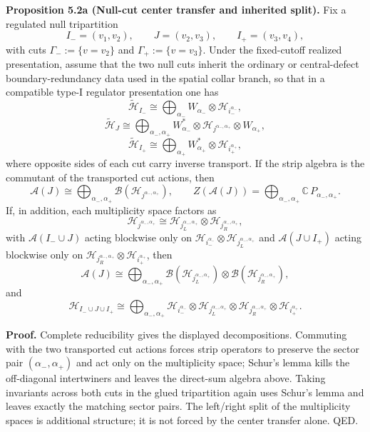 \textbf{Proposition 5.2a (Null-cut center transfer and inherited split).} Fix a regulated null tripartition
\[
I_-=(v_1,v_2),\qquad
J=(v_2,v_3),\qquad
I_+=(v_3,v_4),
\]
with cuts \(\Gamma_-:=\{v=v_2\}\) and \(\Gamma_+:=\{v=v_3\}\). Under the fixed-cutoff realized presentation, assume that the two null cuts inherit the ordinary or central-defect boundary-redundancy data used in the spatial collar branch, so that in a compatible type-I regulator presentation one has
\[
\tilde{\mathcal H}_{I_-}
\cong
\bigoplus_{\alpha_-}
W_{\alpha_-}\otimes \mathcal H_{i_-^{\alpha_-}},
\]
\[
\tilde{\mathcal H}_{J}
\cong
\bigoplus_{\alpha_-,\alpha_+}
W_{\alpha_-}^{*}\otimes
\mathcal H_{j^{\alpha_-,\alpha_+}}\otimes
W_{\alpha_+},
\]
\[
\tilde{\mathcal H}_{I_+}
\cong
\bigoplus_{\alpha_+}
W_{\alpha_+}^{*}\otimes \mathcal H_{i_+^{\alpha_+}},
\]
where opposite sides of each cut carry inverse transport. If the strip algebra is the commutant of the transported cut actions, then
\[
\mathcal A(J)
\cong
\bigoplus_{\alpha_-,\alpha_+}
\mathcal B(\mathcal H_{j^{\alpha_-,\alpha_+}}),
\qquad
Z(\mathcal A(J))
=
\bigoplus_{\alpha_-,\alpha_+}\mathbb C\,P_{\alpha_-,\alpha_+}.
\]
If, in addition, each multiplicity space factors as
\[
\mathcal H_{j^{\alpha_-,\alpha_+}}
\cong
\mathcal H_{j_L^{\alpha_-,\alpha_+}}
\otimes
\mathcal H_{j_R^{\alpha_-,\alpha_+}},
\]
with \(\mathcal A(I_-\cup J)\) acting blockwise only on
\(\mathcal H_{i_-^{\alpha_-}}\otimes \mathcal H_{j_L^{\alpha_-,\alpha_+}}\)
and \(\mathcal A(J\cup I_+)\) acting blockwise only on
\(\mathcal H_{j_R^{\alpha_-,\alpha_+}}\otimes \mathcal H_{i_+^{\alpha_+}}\),
then
\[
\mathcal A(J)
\cong
\bigoplus_{\alpha_-,\alpha_+}
\mathcal B(\mathcal H_{j_L^{\alpha_-,\alpha_+}})
\otimes
\mathcal B(\mathcal H_{j_R^{\alpha_-,\alpha_+}}),
\]
and
\[
\mathcal H_{I_-\cup J\cup I_+}
\cong
\bigoplus_{\alpha_-,\alpha_+}
\mathcal H_{i_-^{\alpha_-}}
\otimes
\mathcal H_{j_L^{\alpha_-,\alpha_+}}
\otimes
\mathcal H_{j_R^{\alpha_-,\alpha_+}}
\otimes
\mathcal H_{i_+^{\alpha_+}}.
\]

\textbf{Proof.} Complete reducibility gives the displayed decompositions. Commuting with the two transported cut actions forces strip operators to preserve the sector pair \((\alpha_-,\alpha_+)\) and act only on the multiplicity space; Schur's lemma kills the off-diagonal intertwiners and leaves the direct-sum algebra above. Taking invariants across both cuts in the glued tripartition again uses Schur's lemma and leaves exactly the matching sector pairs. The left/right split of the multiplicity spaces is additional structure; it is not forced by the center transfer alone. QED.

